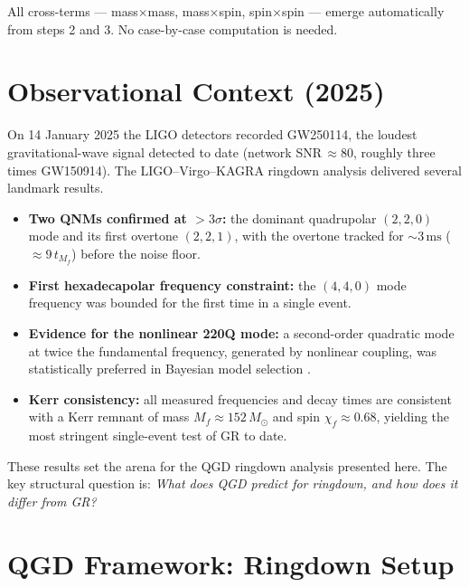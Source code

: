 \documentclass[11pt,a4paper]{article}
\theoremstyle{definition}
\theoremstyle{remark}
\begin{document}
	All cross-terms — mass$\times$mass, mass$\times$spin, spin$\times$spin — 
	emerge automatically from steps 2 and 3. No case-by-case computation is needed.

	\section{Observational Context (2025)}
	\label{sec:obs}
	
	On 14 January 2025 the LIGO detectors recorded GW250114, the loudest
	gravitational-wave signal detected to date (network
	SNR\,$\approx\!80$, roughly three times GW150914). The
	LIGO--Virgo--KAGRA ringdown analysis \cite{LVK2025} delivered several
	landmark results.
	
	\begin{itemize}
		\item \textbf{Two QNMs confirmed at $>3\sigma$:} the dominant
		quadrupolar $(2,2,0)$ mode and its first overtone $(2,2,1)$, with
		the overtone tracked for ${\sim}3\,\mathrm{ms}$
		($\approx\!9\,t_{M_f}$) before the noise floor.
		
		\item \textbf{First hexadecapolar frequency constraint:} the $(4,4,0)$
		mode frequency was bounded for the first time in a single event.
		
		\item \textbf{Evidence for the nonlinear 220Q mode:} a second-order
		quadratic mode at twice the fundamental frequency, generated by
		nonlinear coupling, was statistically preferred in Bayesian model
		selection \cite{Nonlinear2025}.
		
		\item \textbf{Kerr consistency:} all measured frequencies and decay
		times are consistent with a Kerr remnant of mass
		$M_f\!\approx\!152\,M_\odot$ and spin $\chi_f\!\approx\!0.68$,
		yielding the most stringent single-event test of GR to date.
	\end{itemize}
	
	These results set the arena for the QGD ringdown analysis presented here.
	The key structural question is: \emph{What does QGD predict for ringdown,
		and how does it differ from GR?}
	
	\section{QGD Framework: Ringdown Setup}
	\label{sec:setup}
	
\end{document}
